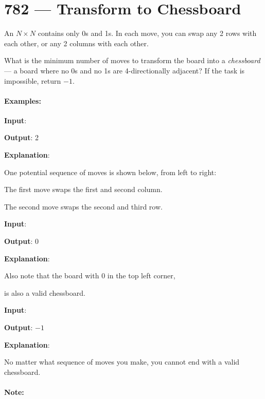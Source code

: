 \section{782 --- Transform to Chessboard}
An $N \times N$  contains only 0s and 1s. In each move, you can swap any 2 rows with each other, or any 2 columns with each other.

What is the minimum number of moves to transform the board into a \textit{chessboard} --- a board where no 0s and no 1s are 4-directionally adjacent? If the task is impossible, return $-1$.

\paragraph{Examples:}
\begin{flushleft}
\textbf{Input}: 

\textbf{Output}: 2

\textbf{Explanation}:

One potential sequence of moves is shown below, from left to right:





The first move swaps the first and second column.

The second move swaps the second and third row.

\textbf{Input}: 

\textbf{Output}: 0

\textbf{Explanation}:

Also note that the board with 0 in the top left corner,



is also a valid chessboard.

\textbf{Input}: 

\textbf{Output}: $-1$

\textbf{Explanation}:

No matter what sequence of moves you make, you cannot end with a valid chessboard.


\end{flushleft}
\paragraph{Note:}

